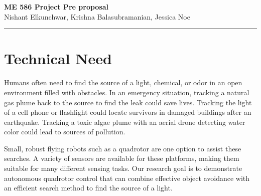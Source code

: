 \documentclass{article}
\date{}
\begin{document}
\begin{center}
    \huge{\textbf{ME 586 Project Pre proposal}\\}
    \vspace{0.3em}
    \Large{Nishant Elkunchwar, Krishna Balasubramanian, Jessica Noe}
    \rule{6.1in}{0.2pt}
\end{center}
\vspace{-2em}
\section*{Technical Need}
Humans often need to find the source of a light, chemical, or odor in an open environment filled with obstacles. In an emergency situation, tracking a natural gas plume back to the source to find the leak could save lives. Tracking the light of a cell phone or flashlight could locate survivors in damaged buildings after an earthquake. Tracking a toxic algae plume with an aerial drone detecting water color could lead to sources of pollution.
\par
Small, robust flying robots such as a quadrotor are one option to assist these searches. A variety of sensors are available for these platforms, making them suitable for many different sensing tasks. Our research goal is to demonstrate autonomous quadrotor control that can combine effective object avoidance with an efficient search method to find the source of a light.
\end{document}
